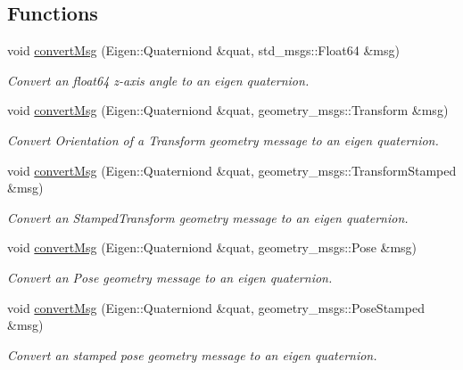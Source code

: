\subsection*{Functions}
\begin{DoxyCompactItemize}
\item 
void \hyperlink{group__multi__robot__controller_ga465b07e16106af072ed5315010fa876c}{convert\+Msg} (Eigen\+::\+Quaterniond \&quat, std\+\_\+msgs\+::\+Float64 \&msg)
\begin{DoxyCompactList}\small\item\em Convert an float64 z-\/axis angle to an eigen quaternion. \end{DoxyCompactList}\item 
void \hyperlink{group__multi__robot__controller_gad42169e0be94216cd31a8a360a848155}{convert\+Msg} (Eigen\+::\+Quaterniond \&quat, geometry\+\_\+msgs\+::\+Transform \&msg)
\begin{DoxyCompactList}\small\item\em Convert Orientation of a Transform geometry message to an eigen quaternion. \end{DoxyCompactList}\item 
void \hyperlink{group__multi__robot__controller_ga34987bf2293cc8aa5fac7ac60e6510ef}{convert\+Msg} (Eigen\+::\+Quaterniond \&quat, geometry\+\_\+msgs\+::\+Transform\+Stamped \&msg)
\begin{DoxyCompactList}\small\item\em Convert an Stamped\+Transform geometry message to an eigen quaternion. \end{DoxyCompactList}\item 
void \hyperlink{group__multi__robot__controller_gadc07db93efb76fd809b67b74dd13b939}{convert\+Msg} (Eigen\+::\+Quaterniond \&quat, geometry\+\_\+msgs\+::\+Pose \&msg)
\begin{DoxyCompactList}\small\item\em Convert an Pose geometry message to an eigen quaternion. \end{DoxyCompactList}\item 
void \hyperlink{group__multi__robot__controller_ga8257db2bb94ec53eadfe87d04b38cc0b}{convert\+Msg} (Eigen\+::\+Quaterniond \&quat, geometry\+\_\+msgs\+::\+Pose\+Stamped \&msg)
\begin{DoxyCompactList}\small\item\em Convert an stamped pose geometry message to an eigen quaternion. \end{DoxyCompactList}\item 

\end{DoxyCompactItemize}
